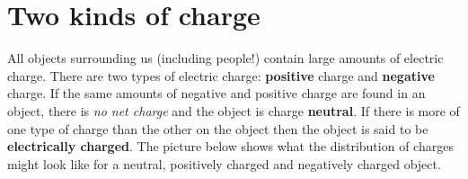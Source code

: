             \section{Two kinds of charge}
            \nopagebreak
      \label{m38780*id200267}All objects surrounding us (including people!) contain large amounts of electric charge. There
are two types of electric charge: \textbf{positive} charge and \textbf{negative} charge.
If the same amounts of negative and positive charge are found in an object, there
is \textsl{no net charge} and the object is charge \textbf{neutral}. If there is more of one type of charge than the other on the object then the object is said to be \textbf{electrically charged}. The picture below shows
what the distribution of charges might look like for a neutral, positively charged and
negatively charged object.\par 
      \label{m38780*id200640}

